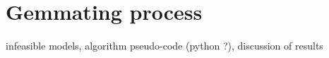 \section{Gemmating process}

  infeasible models, 
  algorithm pseudo-code (python ?),
  discussion of results

